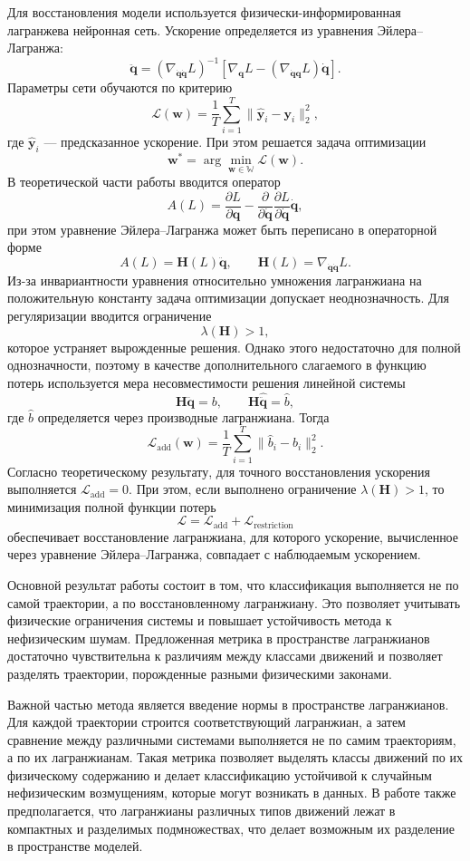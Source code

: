 \documentclass[twoside]{article}
\begin{document}
Для восстановления модели используется физически-информированная лагранжева нейронная сеть. Ускорение определяется из уравнения Эйлера--Лагранжа:
$$
\ddot{\mathbf q}
=\left(\nabla_{\dot{\mathbf q}\dot{\mathbf q}}L\right)^{-1}
\left[\nabla_{\mathbf q}L-\left(\nabla_{\dot{\mathbf q}\mathbf q}L\right)\dot{\mathbf q}\right].
$$
Параметры сети обучаются по критерию
$$
\mathcal L(\mathbf w)=\frac{1}{T}\sum_{i=1}^{T}\|\hat{\mathbf y}_i-\mathbf y_i\|_2^2,
$$
где $\hat{\mathbf y}_i$ --- предсказанное ускорение. При этом решается задача оптимизации
$$
\mathbf w^* = \arg\min_{\mathbf w \in \mathbb W} \mathcal L(\mathbf w).
$$
В теоретической части работы вводится оператор
$$
A(L)=\frac{\partial L}{\partial \mathbf q}-\frac{\partial}{\partial \dot{\mathbf q}}\frac{\partial L}{\partial \dot{\mathbf q}}\dot{\mathbf q},
$$
при этом уравнение Эйлера--Лагранжа может быть переписано в операторной форме
$$
A(L)=\mathbf H(L)\ddot{\mathbf q},
\qquad
\mathbf H(L)=\nabla_{\dot{\mathbf q}\dot{\mathbf q}}L.
$$
Из-за инвариантности уравнения относительно умножения лагранжиана на положительную константу задача оптимизации допускает неоднозначность. Для регуляризации вводится ограничение
$$
\lambda(\mathbf H)>1,
$$
которое устраняет вырожденные решения. Однако этого недостаточно для полной однозначности, поэтому в качестве дополнительного слагаемого в функцию потерь используется мера несовместимости решения линейной системы
$$
\mathbf H\ddot{\mathbf q}=b,
\qquad
\mathbf H\hat{\ddot{\mathbf q}}=\hat b,
$$
где $\hat b$ определяется через производные лагранжиана. Тогда
$$
\mathcal L_{\text{add}}(\mathbf w)=\frac{1}{T}\sum_{i=1}^{T}\|\hat b_i-b_i\|_2^2.
$$
Согласно теоретическому результату, для точного восстановления ускорения выполняется $\mathcal L_{\text{add}}=0$. При этом, если выполнено ограничение $\lambda(\mathbf H)>1$, то минимизация полной функции потерь
$$
\mathcal L=\mathcal L_{\text{add}}+\mathcal L_{\text{restriction}}
$$
обеспечивает восстановление лагранжиана, для которого ускорение, вычисленное через уравнение Эйлера--Лагранжа, совпадает с наблюдаемым ускорением.
 
Основной результат работы состоит в том, что классификация выполняется не по самой траектории, а по восстановленному лагранжиану. Это позволяет учитывать физические ограничения системы и повышает устойчивость метода к нефизическим шумам. Предложенная метрика в пространстве лагранжианов достаточно чувствительна к различиям между классами движений и позволяет разделять траектории, порожденные разными физическими законами.

Важной частью метода является введение нормы в пространстве лагранжианов. Для каждой траектории строится соответствующий лагранжиан, а затем сравнение между различными системами выполняется не по самим траекториям, а по их лагранжианам. Такая метрика позволяет выделять классы движений по их физическому содержанию и делает классификацию устойчивой к случайным нефизическим возмущениям, которые могут возникать в данных. В работе также предполагается, что лагранжианы различных типов движений лежат в компактных и разделимых подмножествах, что делает возможным их разделение в пространстве моделей.
\end{document}

